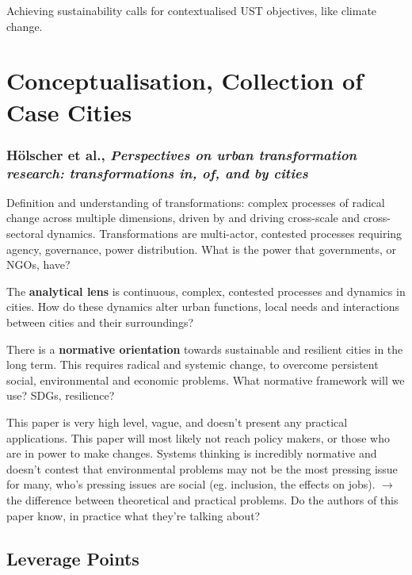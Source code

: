 \documentclass{article}
\begin{document}
Achieving sustainability calls for contextualised UST objectives, like climate change.

\section{Conceptualisation, Collection of Case Cities}

\subsubsection{Hölscher et al., \textit{Perspectives on urban transformation research: transformations in, of, and by cities}}

Definition and understanding of transformations: complex processes of radical change across multiple dimensions, driven by and driving cross-scale and cross-sectoral dynamics. Transformations are multi-actor, contested processes requiring agency, governance, power distribution. What is the power that governments, or NGOs, have?

The \textbf{analytical lens} is continuous, complex, contested processes and dynamics in cities. How do these dynamics alter urban functions, local needs and interactions between cities and their surroundings?

There is a \textbf{normative orientation} towards sustainable and resilient cities in the long term. This requires radical and systemic change, to overcome persistent social, environmental and economic problems. What normative framework will we use? SDGs, resilience? 

This paper is very high level, vague, and doesn't present any practical applications. This paper will most likely not reach policy makers, or those who are in power to make changes. Systems thinking is incredibly normative and doesn't contest that environmental problems may not be the most pressing issue for many, who's pressing issues are social (eg. inclusion, the effects on jobs). $\rightarrow$ the difference between theoretical and practical problems. Do the authors of this paper know, in practice what they're talking about?

\subsection{Leverage Points}
\end{document}
